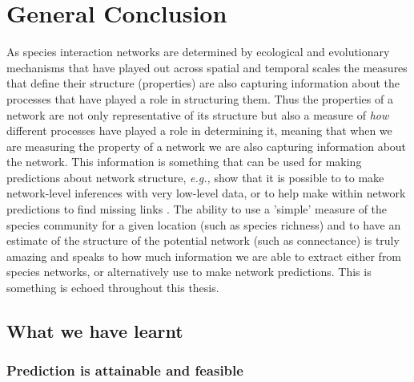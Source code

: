 \anglais
\doublespacing
\chapter{General Conclusion}\label{Conclusion}

As species interaction networks are determined by ecological and evolutionary mechanisms that have played out across spatial and temporal scales the measures that define their structure (properties) are also capturing information about the processes that have played a role in structuring them. Thus the properties of a network are not only representative of its structure but also a measure of \emph{how} different processes have played a role in determining it, meaning that when we are measuring the property of a network we are also capturing information about the network. This information is something that can be used for making predictions about network structure, \emph{e.g.,} \cite{MacDonald2020RevLina, Banville2023What} show that it is possible to to make network-level inferences with very low-level data, or to help make within network predictions to find missing links \cite{Poisot2021ImpMam, Stock2021PaiLea}. The ability to use a 'simple' measure of the species community for a given location (such as species richness) and to have an estimate of the structure of the potential network (such as connectance) is truly amazing and speaks to how much information we are able to extract either from species networks, or alternatively use to make network predictions. This is something is echoed throughout this thesis.

\section{What we have learnt}

\subsection{Prediction is attainable and feasible}

